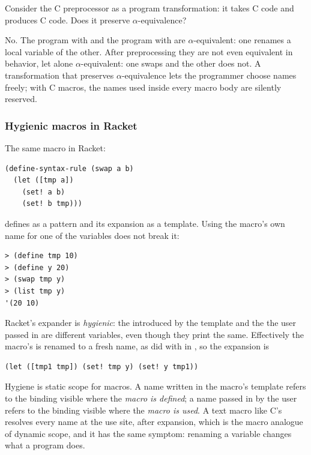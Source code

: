 \begin{exercise}
Consider the C preprocessor as a program transformation: it takes C code and produces C code. Does it preserve $\alpha$-equivalence?
\end{exercise}
\begin{solution}
No. The program with  and the program with  are $\alpha$-equivalent: one renames a local variable of the other. After preprocessing they are not even equivalent in behavior, let alone $\alpha$-equivalent: one swaps and the other does not. A transformation that preserves $\alpha$-equivalence lets the programmer choose names freely; with C macros, the names used inside every macro body are silently reserved.
\end{solution}

\subsubsection{Hygienic macros in Racket} The same macro in Racket:
\begin{lstlisting}
(define-syntax-rule (swap a b)
  (let ([tmp a])
    (set! a b)
    (set! b tmp)))
\end{lstlisting}
 defines  as a pattern and its expansion as a template. Using the macro's own name for one of the variables does not break it:
\begin{lstlisting}[style=repl]
> (define tmp 10)
> (define y 20)
> (swap tmp y)
> (list tmp y)
'(20 10)
\end{lstlisting}
Racket's expander is \emph{hygienic}: the  introduced by the template and the  the user passed in are different variables, even though they print the same. Effectively the macro's  is renamed to a fresh name, as  did with  in , so the expansion is
\begin{lstlisting}
(let ([tmp1 tmp]) (set! tmp y) (set! y tmp1))
\end{lstlisting}

\begin{keypoint}
Hygiene is static scope for macros. A name written in the macro's template refers to the binding visible where the \emph{macro is defined}; a name passed in by the user refers to the binding visible where the \emph{macro is used}. A text macro like C's resolves every name at the use site, after expansion, which is the macro analogue of dynamic scope, and it has the same symptom: renaming a variable changes what a program does.
\end{keypoint}


